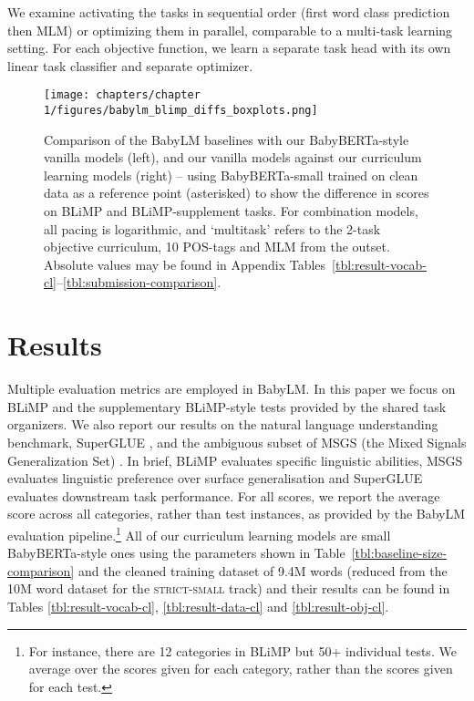 We examine activating the tasks in sequential order (first word class prediction then MLM) or optimizing them in parallel, comparable to a multi-task learning setting. For each objective function, we learn a separate task head with its own linear task classifier and separate optimizer. 



\begin{figure*}
\centering
\texttt{[image: chapters/chapter 1/figures/babylm\_blimp\_diffs\_boxplots.png]}
\caption{\label{fig:blimp-boxplots} Comparison of the BabyLM baselines with our BabyBERTa-style vanilla models (left), and our vanilla models against our curriculum learning models (right) -- using BabyBERTa-small trained on clean data as a reference point (asterisked) to show the difference in scores on BLiMP and BLiMP-supplement tasks. For combination models, all pacing is logarithmic, and `multitask' refers to the 2-task objective curriculum, 10 POS-tags and MLM from the outset. Absolute values may be found in Appendix Tables~\ref{tbl:result-vocab-cl}--\ref{tbl:submission-comparison}.
}
\end{figure*}


\section{Results}

Multiple evaluation metrics are employed in BabyLM. In this paper we focus on BLiMP \cite{warstadt2020blimp} and the supplementary BLiMP-style tests provided by the shared task organizers. We also report our results on the natural language understanding benchmark, SuperGLUE \cite{wang2019superglue}, and the ambiguous subset of MSGS (the Mixed Signals Generalization Set) \cite{warstadt2020msgs}. In brief, BLiMP evaluates specific linguistic abilities, MSGS evaluates linguistic preference over surface generalisation and SuperGLUE evaluates downstream task performance. For all scores, we report the average score across all categories, rather than test instances, as provided by the BabyLM evaluation pipeline.\footnote{For instance, there are 12 categories in BLiMP but 50+ individual tests. We average over the scores given for each category, rather than the scores given for each test.} All of our curriculum learning models are small BabyBERTa-style ones using the parameters shown in Table~\ref{tbl:baseline-size-comparison} and the cleaned training dataset of 9.4M words (reduced from the 10M word dataset for the \textsc{strict-small} track) and their results can be found in Tables \ref{tbl:result-vocab-cl}, \ref{tbl:result-data-cl} and \ref{tbl:result-obj-cl}. 

